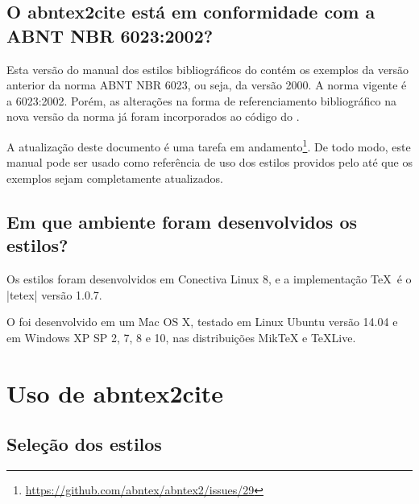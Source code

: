 \documentclass[a4paper]{ltxdoc}
\begin{document}

\subsection{O \textsf{abntex2cite} está em conformidade com a ABNT NBR
6023:2002?}
\label{sec-intro-compatibidade-6023-2002}

Esta versão do manual dos estilos bibliográficos do  contém os exemplos
da versão anterior da norma ABNT NBR 6023, ou seja, da versão 2000. A norma
vigente é a 6023:2002. Porém, as alterações na forma de referenciamento
bibliográfico na nova versão da norma já foram incorporados ao código do
.

A atualização deste documento é uma tarefa em
andamento\footnote{\url{https://github.com/abntex/abntex2/issues/29}}.
De todo modo, este manual pode ser usado como referência de uso dos estilos
providos pelo  até que os exemplos sejam completamente atualizados.

\subsection{Em que ambiente foram desenvolvidos os estilos?}

Os estilos foram desenvolvidos em Conectiva Linux 8, e a implementação \TeX\ é
o |tetex| versão 1.0.7.

O  foi desenvolvido em um Mac OS X, testado em Linux Ubuntu versão 14.04
e em Windows XP SP 2, 7, 8 e 10, nas distribuições MikTeX e TeXLive.

\section{Uso de \textsf{abntex2cite}}

\subsection{Seleção dos estilos}
\end{document}
